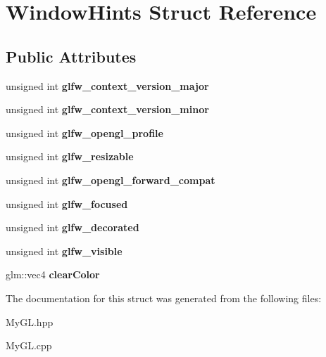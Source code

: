 \hypertarget{structWindowHints}{}\section{Window\+Hints Struct Reference}
\label{structWindowHints}
\subsection*{Public Attributes}
\begin{DoxyCompactItemize}
\item 
unsigned int {\bfseries glfw\+\_\+context\+\_\+version\+\_\+major}\hypertarget{structWindowHints_a90dcc3c10eff6e9fd9e9731f2098283b}{}\label{structWindowHints_a90dcc3c10eff6e9fd9e9731f2098283b}

\item 
unsigned int {\bfseries glfw\+\_\+context\+\_\+version\+\_\+minor}\hypertarget{structWindowHints_aacea0367d5d087bedca46b89db634963}{}\label{structWindowHints_aacea0367d5d087bedca46b89db634963}

\item 
unsigned int {\bfseries glfw\+\_\+opengl\+\_\+profile}\hypertarget{structWindowHints_afd6fae98a69a4ba82c1c52ef1ea48f36}{}\label{structWindowHints_afd6fae98a69a4ba82c1c52ef1ea48f36}

\item 
unsigned int {\bfseries glfw\+\_\+resizable}\hypertarget{structWindowHints_a0fc16ab2b3016a981bb6983459e68e39}{}\label{structWindowHints_a0fc16ab2b3016a981bb6983459e68e39}

\item 
unsigned int {\bfseries glfw\+\_\+opengl\+\_\+forward\+\_\+compat}\hypertarget{structWindowHints_ac5865247be3897b58f28c094035ea74b}{}\label{structWindowHints_ac5865247be3897b58f28c094035ea74b}

\item 
unsigned int {\bfseries glfw\+\_\+focused}\hypertarget{structWindowHints_a3f9ec495707991985a0105a55e9ab8b4}{}\label{structWindowHints_a3f9ec495707991985a0105a55e9ab8b4}

\item 
unsigned int {\bfseries glfw\+\_\+decorated}\hypertarget{structWindowHints_af8ee369e4bf0d0325f89911bbff4845a}{}\label{structWindowHints_af8ee369e4bf0d0325f89911bbff4845a}

\item 
unsigned int {\bfseries glfw\+\_\+visible}\hypertarget{structWindowHints_a7d5abc43b09c0dec6a87fe0d43cb55aa}{}\label{structWindowHints_a7d5abc43b09c0dec6a87fe0d43cb55aa}

\item 
glm\+::vec4 {\bfseries clear\+Color}\hypertarget{structWindowHints_a740edaeaf708ea2d639b2dbfb488c57c}{}\label{structWindowHints_a740edaeaf708ea2d639b2dbfb488c57c}

\end{DoxyCompactItemize}


The documentation for this struct was generated from the following files\+:\begin{DoxyCompactItemize}
\item 
My\+G\+L.\+hpp\item 
My\+G\+L.\+cpp\end{DoxyCompactItemize}
